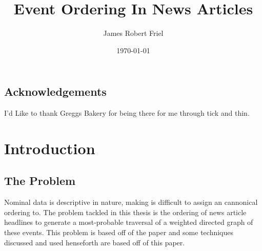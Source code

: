 \documentclass[bsc,frontabs,twoside,singlespacing,parskip,deptreport]{infthesis}     %
\begin{document}
\title{Event Ordering In News Articles}

\author{James Robert Friel}



\date{\today}

\abstract{}


\maketitle

\section*{Acknowledgements}
I'd Like to thank Greggs Bakery for being there for me through tick and thin.

\tableofcontents



\chapter{Introduction}
\section{The Problem}
Nominal data is descriptive in nature, making is difficult to assign an cannonical ordering to.
The problem tackled in this thesis is the ordering of news article headlines to generate
a most-probable traversal of a weighted directed graph of these events.
This problem is based off of the paper \cite{abend2015lexical} and some
techniques discussed and used henseforth are based off of this paper.
\end{document}
